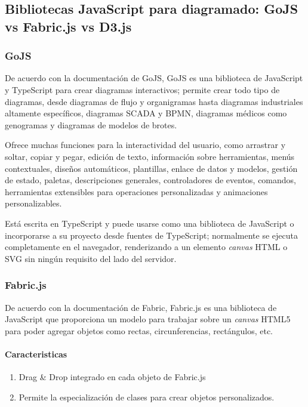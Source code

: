 \subsection{Bibliotecas JavaScript para diagramado: GoJS vs Fabric.js vs D3.js}
\subsubsection*{GoJS}
De acuerdo con la documentación de GoJS\cite{noauthor_gojs_nodate}, GoJS es una biblioteca de JavaScript y TypeScript para crear diagramas interactivos; permite crear todo tipo de diagramas, desde diagramas de flujo y organigramas hasta diagramas industriales altamente específicos, diagramas SCADA y BPMN, diagramas médicos como genogramas y diagramas de modelos de brotes. 


Ofrece muchas funciones para la interactividad del usuario, como arrastrar y soltar, copiar y pegar, edición de texto, información sobre herramientas, menús contextuales, diseños automáticos, plantillas, enlace de datos y modelos, gestión de estado, paletas, descripciones generales, controladores de eventos, comandos, herramientas extensibles para operaciones personalizadas y animaciones personalizables.


Está escrita en TypeScript y puede usarse como una biblioteca de JavaScript o incorporarse a su proyecto desde fuentes de TypeScript; normalmente se ejecuta completamente en el navegador, renderizando a un elemento \textit{canvas} HTML o SVG sin ningún requisito del lado del servidor.


\subsubsection*{Fabric.js}

De acuerdo con la documentación de Fabric\cite{noauthor_fabric_2020}, Fabric.js es una biblioteca de JavaScript que proporciona un modelo para trabajar sobre un \textit{canvas} HTML5 para poder agregar objetos como rectas, circunferencias, rectángulos, etc.

\paragraph*{Caracteristicas}
\begin{enumerate}
    \item Drag \& Drop integrado en cada objeto de Fabric.js
    \item Permite la especialización de clases para crear objetos personalizados.
\end{enumerate}


